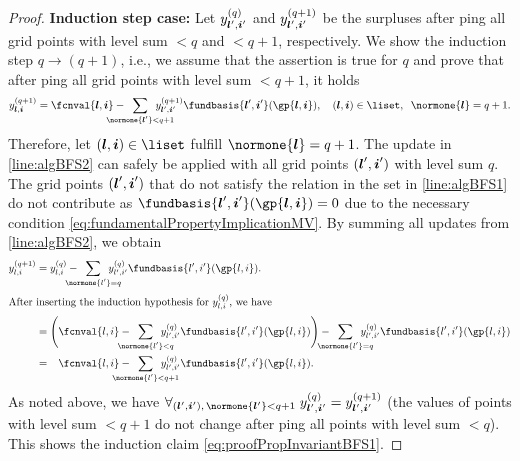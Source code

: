 \begin{proof}
  \noindent
  \textbf{Induction step case:}
  Let $\linout[(q)]{\*l',\*i'}$ and
  $\linout[(q+1)]{\*l',\*i'}$
  be the surpluses after \pop{}ping all
  grid points with level sum $< q$ and $< q + 1$, respectively.
  We show the induction step $q \to (q + 1)$, i.e.,
  we assume that the assertion is true for $q$
  and prove that after \pop{}ping all grid points with level sum $< q + 1$,
  it holds
  \begin{equation}
    \label{eq:proofPropInvariantBFS1}
    \linout[(q+1)]{\*l,\*i}
    = \fcnval{\*l,\*i} -
    \largesum{\normone{\*l'} < q+1} \linout[(q+1)]{\*l',\*i'}
    \fundbasis{\*l',\*i'}(\gp{\*l,\*i}),\quad
    (\*l, \*i) \in \liset,\;\;
    \normone{\*l} = q+1.
  \end{equation}
  Therefore, let $(\*l, \*i) \in \liset$ fulfill $\normone{\*l} = q+1$.
  The update in \cref{line:algBFS2} can safely be applied
  with all grid points $({\boldsymbol{l}}', {\boldsymbol{i}}')$ with level sum $q$.
  The grid points $({\boldsymbol{l}}', {\boldsymbol{i}}')$ that do not satisfy the relation in the set in
  \cref{line:algBFS1} do not contribute as
  $\fundbasis{\*l',\*i'}(\gp{\*l,\*i}) = 0$
  due to the necessary condition \eqref{eq:fundamentalPropertyImplicationMV}.
  By summing all updates from \cref{line:algBFS2}, we obtain
  \begin{subequations}
    \begin{align}
      \linout[(q+1)]{\*l,\*i}
      &= \linout[(q)]{\*l,\*i} -
      \largesum{\normone{\*l'} = q} \linout[(q)]{\*l',\*i'}
      \fundbasis{\*l',\*i'}(\gp{\*l,\*i}).\\
      \intertext{%
        After inserting the induction hypothesis
        for $\linout[(q)]{\*l,\*i}$, we have%
      }
      &= \Biggl(\fcnval{\*l,\*i} -
      \largesum{\normone{\*l'} < q} \linout[(q)]{\*l',\*i'}
      \fundbasis{\*l',\*i'}(\gp{\*l,\*i})\Biggr) -
      \largesum{\normone{\*l'} = q} \linout[(q)]{\*l',\*i'}
      \fundbasis{\*l',\*i'}(\gp{\*l,\*i})\\
      &= \hphantom{\Biggl(}\fcnval{\*l,\*i} -
      \largesum{\normone{\*l'} < q + 1} \linout[(q)]{\*l',\*i'}
      \fundbasis{\*l',\*i'}(\gp{\*l,\*i}).
    \end{align}
  \end{subequations}
  As noted above, we have
  $\fa{(\*l', \*i'),\, \normone{\*l'} < q + 1}{
    \linout[(q)]{\*l',\*i'} = \linout[(q+1)]{\*l',\*i'}
  }$
  (the values of points with level sum $< q + 1$
  do not change after \pop{}ping all points with level sum $< q$).
  This shows the induction claim \eqref{eq:proofPropInvariantBFS1}.
\end{proof}




